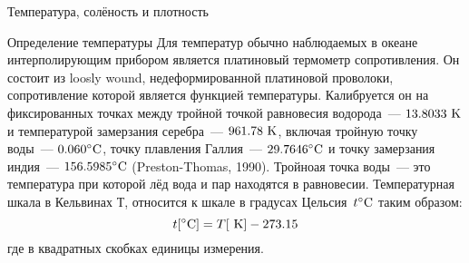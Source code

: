 \begin{chapter}{Температура, солёность и плотность}
\begin{section}{Определение температуры}
Для температур обычно наблюдаемых в океане интерполирующим прибором
является платиновый термометр сопротивления. Он состоит из loosly
wound, недеформированной платиновой проволоки, сопротивление которой
является функцией температуры. Калибруется он на фиксированных точках
между тройной точкой равновесия водорода~--- $13.8033\mbox{~K}$ и
температурой замерзания серебра~--- $961.78\mbox{~K}$, включая тройную
точку воды~--- ${0.060}^\circ\mbox{C}$, точку плавления Галлия~---
${29.7646}^\circ\mbox{C}$ и точку замерзания индия~--- ${156.5985}^\circ\mbox{C}$
(Preston-Thomas, 1990). Тройноая точка воды~--- это температура при
которой лёд вода и пар находятся в равновесии. Температурная шкала в
Кельвинах Т, относится к шкале в градусах Цельсия~${t}^\circ\mbox{C}$ таким
образом:
\begin{equation}
t[{}^\circ\mbox{C}] = T [\mbox{~K}] - 273.15
\end{equation}
где в квадратных скобках единицы измерения. 
%



\end{section}
\end{chapter}
